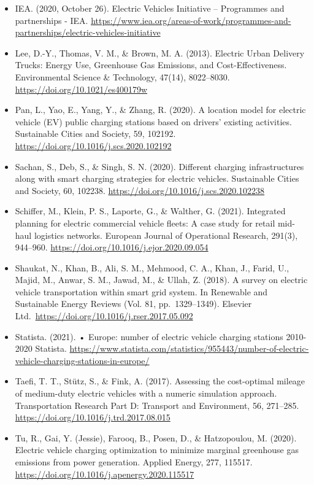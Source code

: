 \documentclass[
]{book}
\begin{document}
\begin{itemize}
\item
  IEA. (2020, October 26). Electric Vehicles Initiative -- Programmes and partnerships - IEA. \url{https://www.iea.org/areas-of-work/programmes-and-partnerships/electric-vehicles-initiative}
\item
  Lee, D.-Y., Thomas, V. M., \& Brown, M. A. (2013). Electric Urban Delivery Trucks: Energy Use, Greenhouse Gas Emissions, and Cost-Effectiveness. Environmental Science \& Technology, 47(14), 8022--8030. \url{https://doi.org/10.1021/es400179w}
\item
  Pan, L., Yao, E., Yang, Y., \& Zhang, R. (2020). A location model for electric vehicle (EV) public charging stations based on drivers' existing activities. Sustainable Cities and Society, 59, 102192. \url{https://doi.org/10.1016/j.scs.2020.102192}
\item
  Sachan, S., Deb, S., \& Singh, S. N. (2020). Different charging infrastructures along with smart charging strategies for electric vehicles. Sustainable Cities and Society, 60, 102238. \url{https://doi.org/10.1016/j.scs.2020.102238}
\item
  Schiffer, M., Klein, P. S., Laporte, G., \& Walther, G. (2021). Integrated planning for electric commercial vehicle fleets: A case study for retail mid-haul logistics networks. European Journal of Operational Research, 291(3), 944--960. \url{https://doi.org/10.1016/j.ejor.2020.09.054}
\item
  Shaukat, N., Khan, B., Ali, S. M., Mehmood, C. A., Khan, J., Farid, U., Majid, M., Anwar, S. M., Jawad, M., \& Ullah, Z. (2018). A survey on electric vehicle transportation within smart grid system. In Renewable and Sustainable Energy Reviews (Vol. 81, pp.~1329--1349). Elsevier Ltd.~\url{https://doi.org/10.1016/j.rser.2017.05.092}
\item
  Statista. (2021). • Europe: number of electric vehicle charging stations 2010-2020 \textbar{} Statista. \url{https://www.statista.com/statistics/955443/number-of-electric-vehicle-charging-stations-in-europe/}
\item
  Taefi, T. T., Stütz, S., \& Fink, A. (2017). Assessing the cost-optimal mileage of medium-duty electric vehicles with a numeric simulation approach. Transportation Research Part D: Transport and Environment, 56, 271--285. \url{https://doi.org/10.1016/j.trd.2017.08.015}
\item
  Tu, R., Gai, Y. (Jessie), Farooq, B., Posen, D., \& Hatzopoulou, M. (2020). Electric vehicle charging optimization to minimize marginal greenhouse gas emissions from power generation. Applied Energy, 277, 115517. \url{https://doi.org/10.1016/j.apenergy.2020.115517}

\end{itemize}
\end{document}
